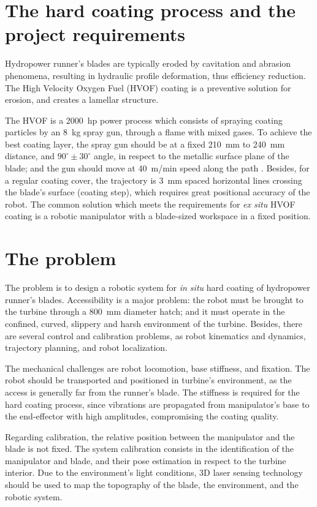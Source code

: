 \section{The hard coating process and the project requirements}\label{hvof}

Hydropower runner's blades are typically eroded by cavitation and abrasion
phenomena, resulting in hydraulic profile deformation, thus efficiency
reduction. The High Velocity Oxygen Fuel (HVOF) coating is a preventive
solution for erosion, and creates a lamellar structure. 

The HVOF is a 2000~hp power process which consists of spraying coating particles
by an 8~kg spray gun, through a flame with mixed gases. To achieve the best
coating layer, the spray gun should be at a fixed 210~mm to 240~mm distance, and
$90^\circ \pm 30^\circ$ angle, in respect to the metallic surface plane of the
blade; and the gun should move at 40~m/min speed along the path
\cite{li2002effect}.  Besides, for a regular coating cover, the trajectory is
3~mm spaced horizontal lines crossing the blade's surface (coating step), which
requires great positional accuracy of the robot.
The common solution which meets the requirements for \textit{ex situ} HVOF
coating is a robotic manipulator with a blade-sized workspace in a fixed
position.

\section{The problem}\label{problem}

The problem is to design a robotic system for \textit{in situ} hard coating of
hydropower runner's blades. Accessibility is a major problem: the robot must be
brought to the turbine through a 800~mm diameter hatch; and it must operate in
the confined, curved, slippery and harsh environment of the turbine. Besides, there are
several control and calibration problems, as robot kinematics and
dynamics, trajectory planning, and robot localization.

The mechanical challenges are robot locomotion, base stiffness, and fixation.
The robot should be transported and positioned in turbine's environment, as the
access is generally far from the runner's blade.
The stiffness is required for the hard coating process, since vibrations are
propagated from manipulator's base to the end-effector with high
amplitudes, compromising the coating quality.

Regarding calibration, the relative position between the manipulator and the
blade is not fixed. The system calibration consists in the identification of
the manipulator and blade, and their pose estimation in respect to the turbine
interior. Due to the environment's light conditions, 3D laser sensing
technology should be used to map the topography of the blade, the
environment, and the robotic system. 

